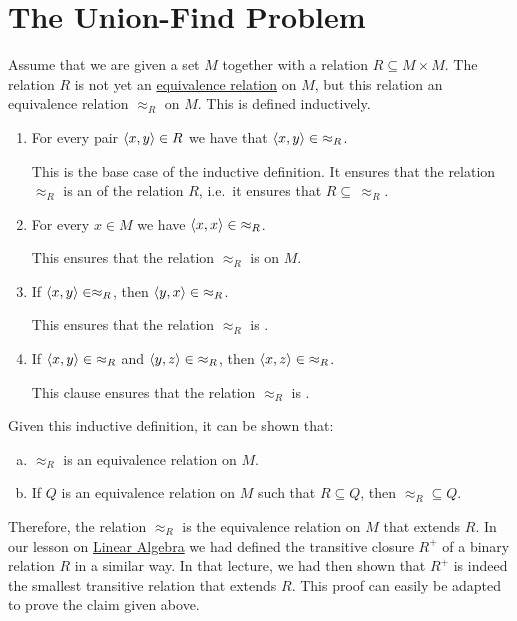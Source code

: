 \section{The Union-Find Problem \label{sec:union-find}}
Assume that we are given a set $M$ together with a relation $R \subseteq M \times M$.  The relation
$R$ is not yet an  \href{https://en.wikipedia.org/wiki/Equivalence_relation}{equivalence relation} on $M$, but
this relation  an equivalence relation $\approx_R$ on $M$.  This
 is defined inductively. 
\begin{enumerate}
\item For every pair $\pair(x,y) \in R$ we have that $\pair(x, y) \in\; \approx_R$.

      This is the base case of the inductive definition.  It ensures that the relation
      $\approx_R$ is an  of the relation $R$, i.e.~it ensures that $R \subseteq\, \approx_R$.
\item For every $x \in M$ we have $\pair(x,x) \in\; \approx_R$.

      This ensures that the relation $\approx_R$ is  on $M$.
\item If $\pair(x,y) \in \approx_R$, then $\pair(y,x) \in\; \approx_R$.

      This  ensures that the relation $\approx_R$ is .
\item If $\pair(x,y) \in\; \approx_R$ and $\pair(y,z) \in\; \approx_R$, then $\pair(x,z) \in\; \approx_R$.

      This clause ensures that the relation $\approx_R$ is .
\end{enumerate}
Given this inductive definition, it can be shown that:
\begin{enumerate}[(a)]
\item $\approx_R$ is an equivalence relation on $M$.
\item If $Q$ is an equivalence relation on $M$ such that $R \subseteq Q$, then $\approx_R \subseteq Q$.
\end{enumerate}
Therefore, the relation $\approx_R$ is the 
equivalence relation on $M$ that extends $R$.  In our lesson on
\href{https://github.com/karlstroetmann/Lineare-Algebra/blob/master/Skript/lineare-algebra.pdf}{Linear Algebra}
we had defined the transitive closure $R^+$ of a binary relation $R$ in a similar way.  In 
that lecture, we had then shown that $R^+$ is indeed the smallest transitive relation that extends
$R$.  This proof can easily be adapted to prove the claim given above.

